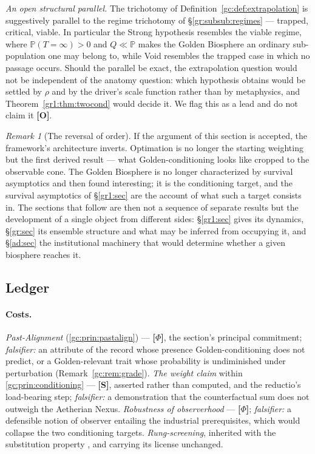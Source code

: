 \documentclass[11pt]{article}
\numberwithin{equation}{section}
\theoremstyle{plain}
\theoremstyle{definition}
\theoremstyle{remark}
\newtheorem{remark}[theorem]{Remark}
\newcommand{\PP}{\mathbb{P}}
\begin{document}
\emph{An open structural parallel.} The trichotomy of
Definition~\ref{gc:def:extrapolation} is suggestively parallel to the
regime trichotomy of \S\ref{gr:subsub:regimes} --- trapped, critical,
viable. In particular the Strong hypothesis resembles the viable
regime, where $\PP(T=\infty)>0$ and $Q\ll\PP$ makes the Golden Biosphere
an ordinary sub-population one may belong to, while Void resembles the
trapped case in which no passage occurs. Should the parallel be exact,
the extrapolation question would not be independent of the anatomy
question: which hypothesis obtains would be settled by $\rho$ and by the
driver's scale function rather than by metaphysics, and
Theorem~\ref{gr1:thm:twocond} would decide it. We flag this as a lead
and do not claim it \textbf{[O]}.

\begin{remark}[The reversal of order]\label{gc:rem:reversal}
If the argument of this section is accepted, the framework's
architecture inverts. Optimation is no longer the starting weighting but
the first derived result --- what Golden-conditioning looks like cropped
to the observable cone. The Golden Biosphere is no longer characterized
by survival asymptotics and then found interesting; it is the
conditioning target, and the survival asymptotics of
\S\ref{gr1:sec} are the account of what such a target consists in. The
sections that follow are then not a sequence of separate results but the
development of a single object from different sides: \S\ref{gr1:sec}
gives its dynamics, \S\ref{gr:sec} its ensemble structure and what may
be inferred from occupying it, and \S\ref{ad:sec} the institutional
machinery that would determine whether a given biosphere reaches it.
\end{remark}

\subsection{Ledger}\label{gc:sub:ledger}

\paragraph{Costs.} \emph{Past-Alignment} (\ref{gc:prin:pastalign}) ---
\textbf{[$\Phi$]}, the section's principal commitment;
\emph{falsifier:} an attribute of the record whose presence
Golden-conditioning does not predict, or a Golden-relevant trait whose
probability is undiminished under perturbation
(Remark~\ref{gc:rem:grade}). \emph{The weight claim} within
\ref{gc:prin:conditioning} --- \textbf{[S]}, asserted rather than
computed, and the reductio's load-bearing step;
\emph{falsifier:} a demonstration that the counterfactual sum does not
outweigh the Aetherian Nexus. \emph{Robustness of observerhood} ---
\textbf{[$\Phi$]}; \emph{falsifier:} a defensible notion of observer
entailing the industrial prerequisites, which would collapse the two
conditioning targets. \emph{Rung-screening}, inherited with the
substitution property \cite{Ben26Optimal}, and carrying its license
unchanged.
\end{document}
